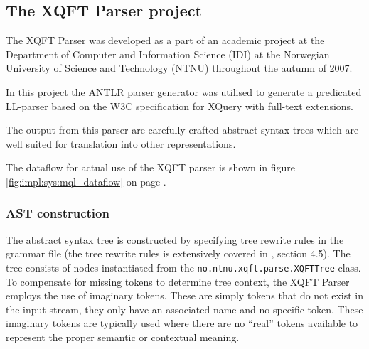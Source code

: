 \subsection{The XQFT Parser project}
\label{sect:theory:xqftparser}
The XQFT Parser\cite{ourselves} was developed as a part of an academic project
at the Department of Computer and Information Science (IDI) at the Norwegian
University of Science and Technology (NTNU) throughout the autumn of 2007.

In this project the ANTLR parser generator was utilised to generate a
predicated LL-parser based on the W3C specification\cite{w3c01} for XQuery with
full-text extensions.

The output from this parser are carefully crafted abstract syntax trees which
are well suited for translation into other representations.

% 

The dataflow for actual use of the XQFT parser is shown in figure
\ref{fig:impl:sys:mql_dataflow} on page \pageref{fig:impl:sys:mql_dataflow}.

\subsubsection{AST construction}
\label{sect:theory:xqftparser:ast_construction}
The abstract syntax tree is constructed by specifying tree rewrite rules in the
grammar file (the tree rewrite rules is extensively covered in \cite{ourselves}, section
4.5). The tree consists of nodes instantiated from the
\verb!no.ntnu.xqft.parse.XQFTTree! class. To compensate for missing tokens to
determine tree context, the XQFT Parser employs the use of imaginary tokens.
These are simply tokens that do not exist in the input stream, they only have
an associated name and no specific token. These imaginary tokens are typically
used where there are no ``real'' tokens available to represent the proper
semantic or contextual meaning.

